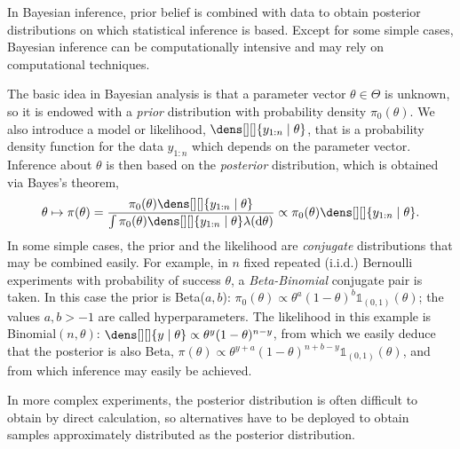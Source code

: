 \documentclass[english,graybox,envcountchap,envcountsame,sectrefs,shortlabels]{svmono}
\theoremstyle{style}
\begin{document}

\begin{example}
In  Bayesian inference, prior belief  is combined with
data to obtain posterior distributions on which statistical inference is based.
Except for some simple cases, Bayesian inference can be computationally
intensive and may rely on  computational techniques.


The basic idea in Bayesian analysis is that a parameter vector $ \theta \in \Theta$ is unknown, so it is endowed with a \emph{prior} distribution with probability density
$\pi_0( \theta)$.  We also
introduce a model or likelihood, $\dens[][]{ y_{1:n} \mid \theta}$, that is
a probability density function for the data $y_{1:n}$ which depends on the parameter vector.
Inference about $ \theta$ is then based on the \emph{posterior}
distribution, which is obtained via Bayes's theorem,
$$
\theta \mapsto \pi(\theta) =\frac{\pi_0( \theta) \dens[][]{ y_{1:n} \mid \theta}}{\int \pi_0( \theta) \dens[][]{ y_{1:n} \mid \theta} \lambda(\rmd \theta)} \propto \pi_0( \theta) \dens[][]{ y_{1:n} \mid \theta}.
$$
  In some simple cases, the prior  and
the likelihood are \emph{conjugate}  distributions that may be combined easily.
For example, in $n$ fixed repeated (i.i.d.) Bernoulli experiments with probability of success $\theta$,
a \emph{Beta-Binomial} conjugate pair is taken.  In this case the prior is
Beta($a,b$):
$\pi_0(\theta) \propto \theta^{a} (1-\theta)^{b}\mathds{1}_{(0,1)}(\theta)$; the values $a,b > -1$  are called
hyperparameters. The likelihood in this example is
Binomial$(n,\theta)$:
$\dens[][]{ y \mid \theta} \propto \theta^y (1-\theta)^{n-y}$, from which
we easily deduce that the
posterior is also Beta,
$\pi ( \theta ) \propto \theta^{y+a}(1-\theta)^{n+b-y }\mathds{1}_{(0,1)}(\theta)
$, and from which inference may easily be achieved.

In more complex experiments, the posterior distribution is often difficult to obtain by direct calculation,
so alternatives have to be deployed to obtain samples approximately distributed as the posterior distribution. 
\end{example}
\end{document}
